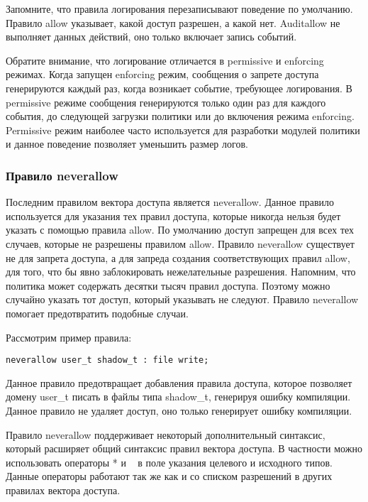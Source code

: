 \documentclass{./../class/UIR}
\begin{document}
    Запомните, что правила логирования перезаписывают поведение по умолчанию.
    Правило allow указывает, какой доступ разрешен, а какой нет. Auditallow не
    выполняет данных действий, оно только включает запись событий.

    Обратите внимание, что логирование отличается в permissive и enforcing
    режимах. Когда запущен enforcing режим, сообщения о запрете доступа
    генерируются каждый раз, когда возникает событие, требующее логирования. В
    permissive режиме сообщения генерируются только один раз для каждого
    события, до следующей загрузки политики или до включения режима enforcing.
    Permissive режим наиболее часто используется для разработки модулей
    политики и данное поведение позволяет уменьшить размер логов.

\subsubsection{Правило neverallow}

    Последним правилом вектора доступа является neverallow. Данное правило
    используется для указания тех правил доступа, которые никогда нельзя будет
    указать с помощью правила allow. По умолчанию доступ запрещен для всех тех
    случаев, которые не разрешены правилом allow. Правило neverallow существует
    не для запрета доступа, а для запреда создания соответствующих правил allow,
    для того, что бы явно заблокировать нежелательные разрешения. Напомним, что
    политика может содержать десятки тысяч правил доступа. Поэтому можно
    случайно указать тот доступ, который указывать не следуют. Правило
    neverallow помогает предотвратить подобные случаи.

    Рассмотрим пример правила:
\begin{verbatim}
neverallow user_t shadow_t : file write;
\end{verbatim}
    Данное правило предотвращает добавления правила доступа, которое позволяет
    домену user\_t писать в файлы типа shadow\_t, генерируя ошибку компиляции.
    Данное правило не удаляет доступ, оно только генерирует ошибку компиляции.

    Правило neverallow поддерживает некоторый дополнительный синтаксис, который
    расширяет общий синтаксис правил вектора доступа. В частности можно
    использовать операторы * и ~ в поле указания целевого и исходного типов.
    Данные операторы работают так же как и со списком разрешений в других
    правилах вектора доступа.
\end{document}
